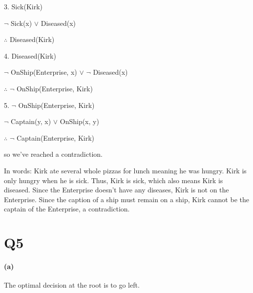 \documentclass[11pt,a4paper]{article}
\begin{document}
3. Sick(Kirk)

$\neg$ Sick(x) $\vee$ Diseased(x)

$\therefore$ Diseased(Kirk)
\newline

4. Diseased(Kirk)

$\neg$ OnShip(Enterprise, x) $\vee$ $\neg$ Diseased(x)

$\therefore$ $\neg$ OnShip(Enterprise, Kirk)
\newline

5. $\neg$ OnShip(Enterprise, Kirk)

$\neg$ Captain(y, x) $\vee$ OnShip(x, y) 

$\therefore$ $\neg$ Captain(Enterprise, Kirk)

so we've reached a contradiction.

In words: Kirk ate several whole pizzas for lunch meaning he was hungry. Kirk is only hungry when he is sick. Thus, Kirk is sick, which also means Kirk is diseased. Since the Enterprise doesn't have any diseases, Kirk is not on the Enterprise. Since the caption of a ship must remain on a ship, Kirk cannot be the captain of the Enterprise, a contradiction.

\section*{Q5}

\paragraph*{(a)}

\begin{center}
\end{center}

The optimal decision at the root is to go left.
\end{document}
